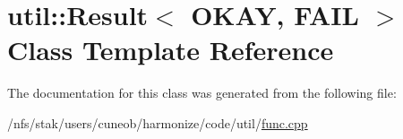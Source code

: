 \hypertarget{classutil_1_1Result}{\section{util\-:\-:Result$<$ O\-K\-A\-Y, F\-A\-I\-L $>$ Class Template Reference}
\label{classutil_1_1Result}
}


The documentation for this class was generated from the following file\-:\begin{DoxyCompactItemize}
\item 
/nfs/stak/users/cuneob/harmonize/code/util/\hyperlink{func_8cpp}{func.\-cpp}\end{DoxyCompactItemize}
